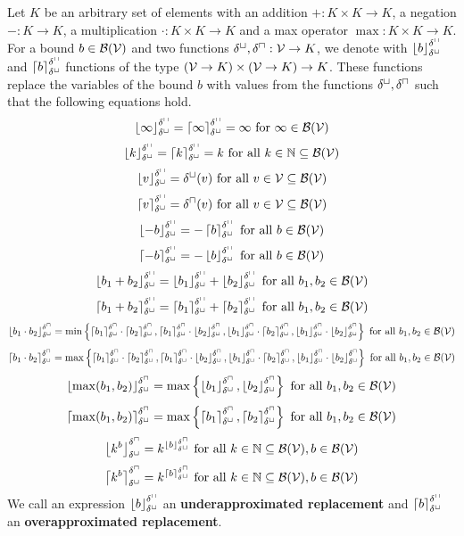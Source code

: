 \begin{definition}
  Let $K$ be an arbitrary set of elements with an addition $+: K \times K \rightarrow K$, a negation $-: K \rightarrow K$, a multiplication $\cdot: K \times K \rightarrow K$ and a max operator $\max: K \times K \rightarrow K$.
  For a bound $b \in \BoundSet(\VSet)$ and two functions $\lsub, \usub: \VSet \rightarrow K$, we denote with $\lsubst{b}{\lsub}{\usub}$ and $\usubst{b}{\lsub}{\usub}$ functions of the type $(\VSet \rightarrow K) \times (\VSet \rightarrow K) \rightarrow K$.
  These functions replace the variables of the bound $b$ with values from the functions $\lsub, \usub$ such that the following equations hold.
  \[ \lsubst{\infty}{\lsub}{\usub} = \usubst{\infty}{\lsub}{\usub} = \infty \text{ for } \infty \in \BoundSet(\VSet) \]
  \[ \lsubst{k}{\lsub}{\usub} = \usubst{k}{\lsub}{\usub} = k \text{ for all } k \in \mathbb{N} \subseteq \BoundSet(\VSet) \] 
  \[ \lsubst{v}{\lsub}{\usub} = \lsub(v) \text{ for all } v \in \VSet \subseteq \BoundSet(\VSet) \] 
  \[ \usubst{v}{\lsub}{\usub} = \usub(v) \text{ for all } v \in \VSet \subseteq \BoundSet(\VSet) \] 
  \[ \lsubst{-b}{\lsub}{\usub} = -\usubst{b}{\lsub}{\usub} \text{ for all } b \in \BoundSet(\VSet) \] 
  \[ \usubst{-b}{\lsub}{\usub} = -\lsubst{b}{\lsub}{\usub} \text{ for all } b \in \BoundSet(\VSet) \] 
  \[ \lsubst{b_1 + b_2}{\lsub}{\usub} = \lsubst{b_1}{\lsub}{\usub} + \lsubst{b_2}{\lsub}{\usub} \text{ for all } b_1, b_2 \in \BoundSet(\VSet) \] 
  \[ \usubst{b_1 + b_2}{\lsub}{\usub} = \usubst{b_1}{\lsub}{\usub} + \usubst{b_2}{\lsub}{\usub} \text{ for all } b_1, b_2 \in \BoundSet(\VSet) \] 
  \[ \lsubst{b_1 \cdot b_2}{\lsub}{\usub} = \minimum{
    \usubst{b_1}{\lsub}{\usub} \cdot \usubst{b_2}{\lsub}{\usub},
    \usubst{b_1}{\lsub}{\usub} \cdot \lsubst{b_2}{\lsub}{\usub},
    \lsubst{b_1}{\lsub}{\usub} \cdot \usubst{b_2}{\lsub}{\usub},
    \lsubst{b_1}{\lsub}{\usub} \cdot \lsubst{b_2}{\lsub}{\usub}
  } \text{ for all } b_1, b_2 \in \BoundSet(\VSet) \] 
  \[ \usubst{b_1 \cdot b_2}{\lsub}{\usub} = \maximum{
    \usubst{b_1}{\lsub}{\usub} \cdot \usubst{b_2}{\lsub}{\usub},
    \usubst{b_1}{\lsub}{\usub} \cdot \lsubst{b_2}{\lsub}{\usub},
    \lsubst{b_1}{\lsub}{\usub} \cdot \usubst{b_2}{\lsub}{\usub},
    \lsubst{b_1}{\lsub}{\usub} \cdot \lsubst{b_2}{\lsub}{\usub}
  } \text{ for all } b_1, b_2 \in \BoundSet(\VSet) \] 
  \[ \lsubst{\max(b_1, b_2)}{\lsub}{\usub} = \maximum{\lsubst{b_1}{\lsub}{\usub}, \lsubst{b_2}{\lsub}{\usub}} \text{ for all } b_1, b_2 \in \BoundSet(\VSet) \]
  \[ \usubst{\max(b_1, b_2)}{\lsub}{\usub} = \maximum{\usubst{b_1}{\lsub}{\usub}, \usubst{b_2}{\lsub}{\usub}} \text{ for all } b_1, b_2 \in \BoundSet(\VSet) \]
  \[ \lsubst{k^b}{\lsub}{\usub} = k^{\lsubst{b}{\lsub}{\usub}} \text{ for all } k \in \mathbb{N} \subseteq \BoundSet(\VSet), b \in \BoundSet(\VSet) \]  
  \[ \usubst{k^b}{\lsub}{\usub} = k^{\usubst{b}{\lsub}{\usub}} \text{ for all } k \in \mathbb{N} \subseteq \BoundSet(\VSet), b \in \BoundSet(\VSet) \]
  We call an expression $\lsubst{b}{\lsub}{\usub}$ an \textbf{underapproximated replacement} and $\usubst{b}{\lsub}{\usub}$ an \textbf{overapproximated replacement}.
\end{definition}

